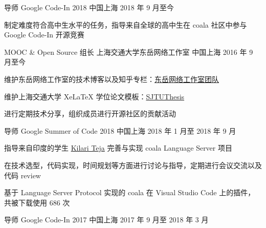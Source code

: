

\begin{cventries}

  \cventry
    {导师} %
    {Google Code-In 2018} %
    {中国上海} %
    {2018 年 9 月至今} %
    {
      \begin{cvitems}
        \item 制定难度符合高中生水平的任务，指导来自全球的高中生在 coala 社区中参与 Google Code-In 开源竞赛
      \end{cvitems}
    }

  \cventry
    {MOOC \& Open Source 组长} %
    {上海交通大学东岳网络工作室} %
    {中国上海} %
    {2016 年 9 月至今} %
    {
      \begin{cvitems}
        \item 维护东岳网络工作室的技术博客以及知乎专栏：\href{https://zhuanlan.zhihu.com/dongyue}{东岳网络工作室团队}
        \item 维护上海交通大学 XeLaTeX 学位论文模板：\href{htts://github.com/sjtug/sjtuthesis}{SJTUThesis}
        \item 进行定期技术分享，组织成员进行开源社区的贡献活动
      \end{cvitems}
    }

  \cventry
    {导师} %
    {Google Summer of Code 2018} %
    {中国上海} %
    {2018 年 1 月至 2018 年 9 月} %
    {
      \begin{cvitems}
        \item 指导来自印度的学生 \href{https://github.com/ksdme}{Kilari Teja} 完善与实现 coala Language Server 项目
        \item 在技术选型，代码实现，时间规划等方面进行讨论与指导，定期进行会议交流以及代码 review
        \item 基于 Language Server Protocol 实现的 coala 在 Visual Studio Code 上的插件，共被下载使用 686 次
      \end{cvitems}
    }

  \cventry
    {导师} %
    {Google Code-In 2017} %
    {中国上海} %
    {2017 年 9 月至 2018 年 3 月} %
    {
    }

\end{cventries}
